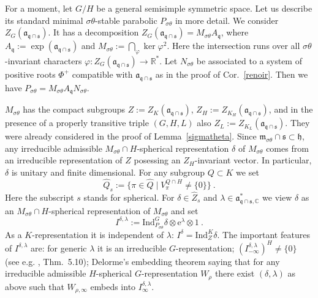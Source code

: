 \documentclass[10]{amsart}
\theoremstyle{remark}
\theoremstyle{definition}
\numberwithin{equation}{section}
\newcommand{\e}{\text{e}}               %
\newcommand{\R}{\mathbb{R}}           %
\newcommand{\C}{\mathbb{C}}           %
\newcommand{\Ind}{\text{Ind}}
\newcommand{\fa}{{\mathfrak a}}             %
\newcommand{\fh}{{\mathfrak h}}
\newcommand{\fm}{{\mathfrak m}}
\newcommand{\fq}{{\mathfrak q}}
\newcommand{\fs}{{\mathfrak s}}
\newcommand{\vp}{\varphi}
\begin{document}
{For a moment, let $G/H$ be a general semisimple symmetric space. Let us describe its standard minimal $\sigma\theta$-stable parabolic $P_{\sigma\theta}$ in more detail. We consider
$Z_G(\fa_{\fq\cap\fs})$. It has a decomposition $Z_G(\fa_{\fq\cap\fs})=M_{\sigma\theta}A_\fq$, where $A_\fq:=\exp(\fa_{\fq\cap\fs})$ and $M_{\sigma\theta}:=\bigcap_\vp \ker\vp^2$. Here the intersection runs over all $\sigma\theta$-invariant characters $\vp: Z_G(\fa_{\fq\cap\fs})\rightarrow \R^*$. Let $N_{\sigma\theta}$ be associated to a system
of positive roots $\Phi^+$ compatible with $\fa_{\fq\cap\fs}$ as in the proof of Cor.~\ref{renoir}. Then we have $P_{\sigma\theta}=M_{\sigma\theta}A_\fq N_{\sigma\theta}$.

$M_{\sigma\theta}$ has the compact subgroups $Z:=Z_K(\fa_{\fq\cap\fs})$, $Z_H:=Z_{K_H}(\fa_{\fq\cap\fs})$, and in the presence of a properly transitive triple $(G,H,L)$ also $Z_L:=Z_{K_L}(\fa_{\fq\cap\fs})$. They were already considered in the proof of Lemma~\ref{sigmatheta}. Since $\fm_{\sigma\theta}\cap\fs\subset\fh$, any irreducible
admissible $M_{\sigma\theta}\cap H$-spherical representation $\delta$ of $M_{\sigma\theta}$ comes from an irreducible representation of $Z$ posessing an $Z_H$-invariant vector.
In particular, $\delta$ is unitary and finite dimensional. For any subgroup $Q\subset K$ we set
$$ \widehat Q_s:=\{\pi\in\widehat Q\mid V_\pi^{Q\cap H}\ne\{0\}\}\ .$$
Here the subscript $s$ stands for spherical. For $\delta\in\widehat Z_s$ and $\lambda\in \fa_{\fq\cap\fs,\C}^*$ we view $\delta$ as an $M_{\sigma\theta}\cap H$-spherical representation  of $M_{\sigma\theta}$ and  set
$$  I^{\delta,\lambda}:=  \Ind_{P_{\sigma\theta}}^{G}\delta\otimes\e^{\lambda}\otimes 1\ .$$
As a $K$-representation it is independent of $\lambda$: $I^\delta=\Ind_{Z}^{K}\delta$. The important features of $I^{\delta,\lambda}$ are: for generic $\lambda$ it is an irreducible
$G$-representation; $(I^{\delta,\lambda}_{-\infty})^H\ne\{0\}$ (see e.g. \cite{Ban88}, Thm.~5.10); Delorme's embedding theorem \cite{Del85} saying that for any irreducible admissible
$H$-spherical $G$-representation $W_\rho$ there exist $(\delta,\lambda)$ as above such that  $W_{\rho,\infty}$ embeds into $I^{\delta,\lambda}_\infty$.

}
\end{document}
